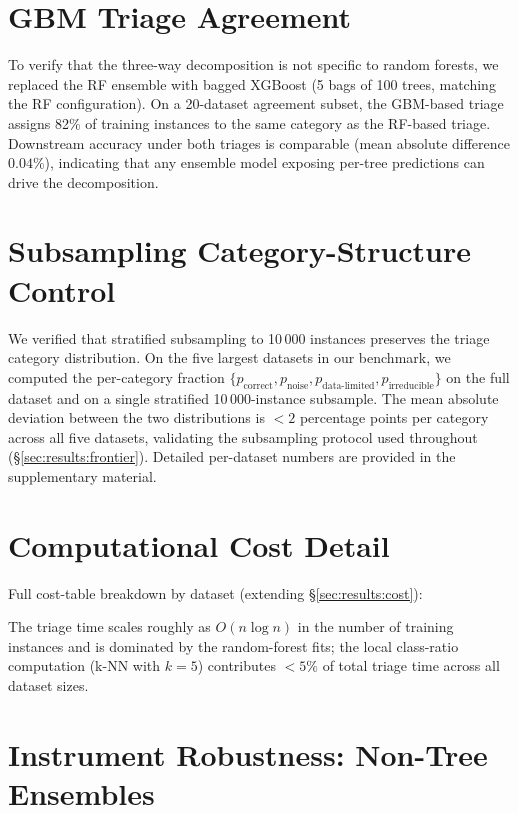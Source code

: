 \section{GBM Triage Agreement}\label{app:gbm}

To verify that the three-way decomposition is not specific to random
forests, we replaced the RF ensemble with bagged XGBoost (5 bags of 100
trees, matching the RF configuration). On a 20-dataset agreement subset,
the GBM-based triage assigns 82\% of training instances to the same category
as the RF-based triage. Downstream accuracy under both triages is
comparable (mean absolute difference $0.04\%$), indicating that any
ensemble model exposing per-tree predictions can drive the decomposition.

\section{Subsampling Category-Structure Control}\label{app:subsampling}

We verified that stratified subsampling to 10\,000 instances preserves the
triage category distribution. On the five largest datasets in our
benchmark, we computed the per-category fraction $\{p_{\text{correct}},
p_{\text{noise}}, p_{\text{data-limited}}, p_{\text{irreducible}}\}$ on the
full dataset and on a single stratified 10\,000-instance subsample. The
mean absolute deviation between the two distributions is $< 2$ percentage
points per category across all five datasets, validating the subsampling
protocol used throughout (\S\ref{sec:results:frontier}).
Detailed per-dataset numbers are provided in the supplementary material.

\section{Computational Cost Detail}\label{app:cost}

Full cost-table breakdown by dataset (extending \S\ref{sec:results:cost}):



The triage time scales roughly as $O(n \log n)$ in the number of training
instances and is dominated by the random-forest fits; the local class-ratio
computation (k-NN with $k=5$) contributes $< 5\%$ of total triage time
across all dataset sizes.

\section{Instrument Robustness: Non-Tree Ensembles}\label{app:nontree}


